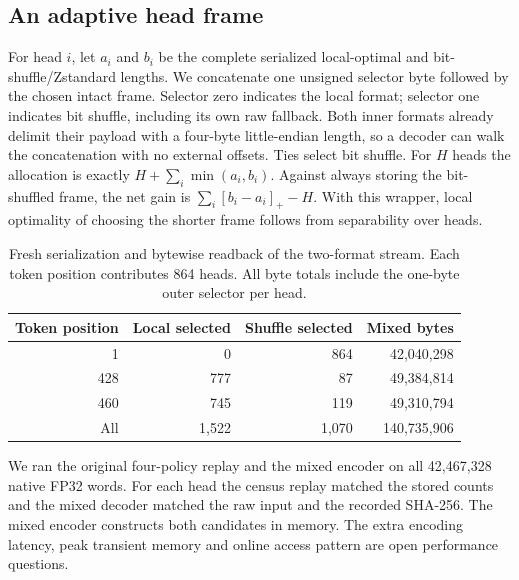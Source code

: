 \subsection{An adaptive head frame}\label{app:mixed}
For head $i$, let $a_i$ and $b_i$ be the complete serialized local-optimal and bit-shuffle/Zstandard lengths. We concatenate one unsigned selector byte followed by the chosen intact frame. Selector zero indicates the local format; selector one indicates bit shuffle, including its own raw fallback. Both inner formats already delimit their payload with a four-byte little-endian length, so a decoder can walk the concatenation with no external offsets. Ties select bit shuffle. For $H$ heads the allocation is exactly $H+\sum_i\min(a_i,b_i)$. Against always storing the bit-shuffled frame, the net gain is $\sum_i[b_i-a_i]_+-H$. With this wrapper, local optimality of choosing the shorter frame follows from separability over heads.

\begin{table}[ht]\centering\small
\caption{Fresh serialization and bytewise readback of the two-format stream. Each token position contributes 864 heads. All byte totals include the one-byte outer selector per head.}
\begin{tabular}{rrrr}\toprule Token position & Local selected & Shuffle selected & Mixed bytes\\\midrule
1 & 0 & 864 & 42,040,298\\
428 & 777 & 87 & 49,384,814\\
460 & 745 & 119 & 49,310,794\\\midrule
All & 1,522 & 1,070 & 140,735,906\\\bottomrule\end{tabular}
\end{table}
We ran the original four-policy replay and the mixed encoder on all 42,467,328 native FP32 words. For each head the census replay matched the stored counts and the mixed decoder matched the raw input and the recorded SHA-256. The mixed encoder constructs both candidates in memory. The extra encoding latency, peak transient memory and online access pattern are open performance questions.


